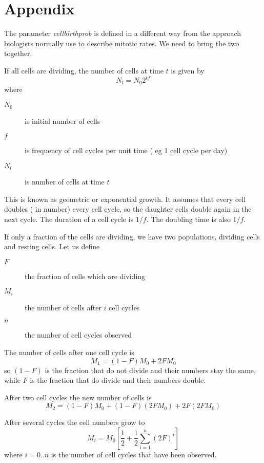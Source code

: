\documentclass[titlepage]{article}  %
\begin{document}
\appendix
\section{Appendix}
The parameter {\em cellbirthprob} is defined in a different way from the approach biologists normally use to describe mitotic rates. We need to bring the two together.

If all cells are dividing, the number of cells at time $t$ is given by
\begin{displaymath}
N_{t} = N_{0} 2^{tf}
\end{displaymath}
where
\begin{description}
\item[$N_{0}$] is initial number of cells
\item[$f$] is frequency of cell cycles per unit time ( eg 1 cell cycle per day)
\item[$N_{t}$] is number of cells at time $t$
\end{description}
This is known as geometric or exponential growth.  It assumes that every cell doubles ( in number) every cell cycle, so the daughter cells double again in the next cycle. The duration of a cell cycle is $1/f$.  The doubling time is also $1/f$. 

If only a fraction of the cells are dividing, we have two populations, dividing cells and resting cells. Let us define
\begin{description}
\item[$F$] the fraction of cells which are dividing
\item[$M_{i}$] the number of cells after $i$ cell cycles
\item[$n$] the number of cell cycles observed
\end{description}

The number of cells after one cell cycle is
\begin{displaymath}
M_{1} = (1-F) M_{0} + 2 F M_{0}
\end{displaymath}
so $(1-F)$ is the fraction that do not divide and their numbers stay the same, while $F$ is the fraction that do divide and their numbers double.

After two cell cycles the new number of cells is
\begin{displaymath}
M_{2} = (1-F) M_{0} + (1-F)( 2 F M_{0}) + 2F (2F M_{0})
\end{displaymath}

After several cycles  the cell numbers grow to
\begin{displaymath}
M_{i} = M_{0} \left[ \frac{1}{2} + \frac{1}{2}\sum_{i=1}^{n} (2 F)^{i} \right]
\end{displaymath}
where $i = 0..n$ is the number of cell cycles that have been observed.
\end{document}
